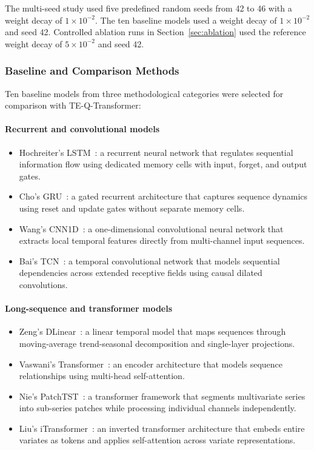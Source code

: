 \documentclass[a4paper,fleqn]{cas-sc}
\begin{document}
The multi-seed study used five predefined random seeds from 42 to 46 with a weight decay of $1\times 10^{-2}$. The ten baseline models used a weight decay of $1\times 10^{-2}$ and seed 42. Controlled ablation runs in Section~\ref{sec:ablation} used the reference weight decay of $5\times 10^{-2}$ and seed 42.

\subsubsection{Baseline and Comparison Methods}\label{sec:baseline_comparison}

Ten baseline models from three methodological categories were selected for comparison with TE-Q-Transformer:

\paragraph{Recurrent and convolutional models}
\begin{itemize}[leftmargin=*,noitemsep,topsep=2pt]
\item Hochreiter's LSTM~\citep{hochreiter1997}: a recurrent neural network that regulates sequential information flow using dedicated memory cells with input, forget, and output gates.
\item Cho's GRU~\citep{cho2014}: a gated recurrent architecture that captures sequence dynamics using reset and update gates without separate memory cells.
\item Wang's CNN1D~\citep{wang2017time}: a one-dimensional convolutional neural network that extracts local temporal features directly from multi-channel input sequences.
\item Bai's TCN~\citep{bai2018empirical}: a temporal convolutional network that models sequential dependencies across extended receptive fields using causal dilated convolutions.
\end{itemize}

\paragraph{Long-sequence and transformer models}
\begin{itemize}[leftmargin=*,noitemsep,topsep=2pt]
\item Zeng's DLinear~\citep{zeng2023}: a linear temporal model that maps sequences through moving-average trend-seasonal decomposition and single-layer projections.
\item Vaswani's Transformer~\citep{vaswani2017}: an encoder architecture that models sequence relationships using multi-head self-attention.
\item Nie's PatchTST~\citep{nie2023patchtst}: a transformer framework that segments multivariate series into sub-series patches while processing individual channels independently.
\item Liu's iTransformer~\citep{liu2024itransformer}: an inverted transformer architecture that embeds entire variates as tokens and applies self-attention across variate representations.
\end{itemize}
\end{document}
